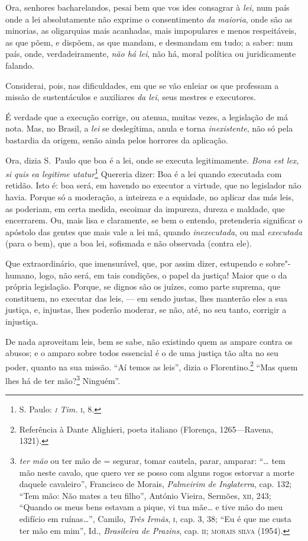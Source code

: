 Ora, senhores bacharelandos, pesai bem que vos ides consagrar à
\textit{lei}, num país onde a lei absolutamente não exprime o
consentimento \textit{da maioria}, onde são as minorias, as oligarquias
mais acanhadas, mais impopulares e menos respeitáveis, as que põem, e
dispõem, as que mandam, e desmandam em tudo; a saber: num país, onde,
verdadeiramente, \textit{não há lei}, não há, moral política ou
juridicamente falando.

Considerai, pois, nas dificuldades, em que se vão enleiar os que
professam a missão de sustentáculos e auxiliares \textit{da lei}, seus
mestres e executores.

É verdade que a execução corrige, ou atenua, muitas vezes, a
legislação de má nota. Mas, no Brasil, a \textit{lei} se deslegítima,
anula e torna \textit{inexistente}, não só pela bastardia da origem,
senão ainda pelos horrores da aplicação.

Ora, dizia S.~Paulo que boa é a lei, onde se executa legitimamente. \textit{Bona est lex,
si quis ea legitime utatur}\footnote{ S. Paulo: \textit{\textsc{i} Tim. }\textsc{i},
8.} Quereria dizer: Boa é a lei quando executada com retidão.
Isto é: boa será, em havendo no executor a virtude, que no legislador
não havia. Porque só a moderação, a inteireza e a equidade, no aplicar
das más leis, as poderiam, em certa medida, escoimar da impureza,
dureza e maldade, que encerrarem. Ou, mais lisa e claramente, se bem o
entendo, pretenderia significar o apóstolo das gentes que mais vale a
lei má, quando \textit{inexecutada}, ou mal \textit{executada} (para o
bem), que a boa lei, sofismada e não observada (contra ele).

Que extraordinário, que imensurável, que, por assim dizer,
estupendo e sobre"-humano, logo, não será, em tais condições, o papel da
justiça! Maior que o da própria legislação. Porque, se dignos são os
juízes, como parte suprema, que constituem, no executar das leis, --- em
sendo justas, lhes manterão eles a sua justiça, e, injustas, lhes
poderão moderar, se não, até, no seu tanto, corrigir a injustiça.

De nada aproveitam leis, bem se sabe, não existindo quem as ampare
contra os abusos; e o amparo sobre todos essencial é o de uma justiça
tão alta no seu poder, quanto na sua missão. ``Aí temos as
leis'', dizia o Florentino.\footnote{ Referência à Dante
Alighieri, poeta italiano (Florença, 1265---Ravena, 1321).} ``Mas quem lhes há de
ter mão?\footnote{ \textit{ter mão} ou ter mão de = segurar, tomar
cautela, parar, amparar: “\ldots{} tem mão neste cavalo, que quero ver se
posso com alguns rogos estorvar a morte daquele cavaleiro”,  Francisco
de Morais, \textit{Palmeirim de Inglaterra}, cap. 132; “Tem mão: Não
mates a teu filho”, António Vieira, Sermões, \textsc{xii}, 243; “Quando os meus
bens estavam a pique, vi tua mãe\ldots{} e tive mão do meu edifício em
ruínas\ldots{}”, Camilo, \textit{Três Irmãs}, \textsc{i}, cap. 3, 38; “Eu é que me
custa ter mão em mim”, Id., \textit{Brasileira de Prazins}, cap. \textsc{ii};
\textsc{morais silva} (1954).} Ninguém''.

